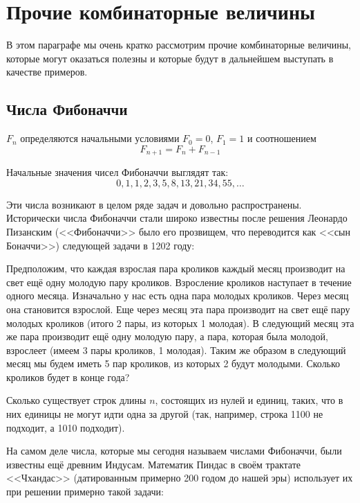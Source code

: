 \section{Прочие комбинаторные величины}

В этом параграфе мы очень кратко рассмотрим прочие комбинаторные величины, которые могут оказаться полезны и которые будут в дальнейшем выступать в качестве примеров.

\subsection{Числа Фибоначчи}

\begin{definition}
 $F_n$ определяются начальными условиями $F_0 = 0$, $F_1 = 1$ и соотношением
$$F_{n+1} = F_n + F_{n-1}$$
\end{definition}

Начальные значения чисел Фибоначчи выглядят так:
$$0, 1, 1, 2, 3, 5, 8, 13, 21, 34, 55, \ldots$$

Эти числа возникают в целом ряде задач и довольно распространены. Исторически числа Фибоначчи стали широко известны после решения Леонардо Пизанским (<<Фибоначчи>>  было его прозвищем, что переводится как <<сын Боначчи>>) следующей задачи в 1202 году:

\begin{exercise}
Предположим, что каждая взрослая пара кроликов каждый месяц производит на свет ещё одну молодую пару кроликов. Взросление кроликов наступает в течение одного месяца. Изначально у нас есть одна пара молодых кроликов. Через месяц она становится взрослой. Еще через месяц эта пара производит на свет ещё пару молодых кроликов (итого 2 пары, из которых 1 молодая). В следующий месяц эта же пара производит ещё одну молодую пару, а пара, которая была молодой, взрослеет (имеем 3 пары кроликов, 1 молодая). Таким же образом в следующий месяц мы будем иметь 5 пар кроликов, из которых 2 будут молодыми. Сколько кроликов будет в конце года?
\end{exercise}

\begin{exercise}
Сколько существует строк длины $n$, состоящих из нулей и единиц, таких, что в них единицы не могут идти одна за другой (так, например, строка 1100 не подходит, а 1010 подходит).
\end{exercise}

На самом деле числа, которые мы сегодня называем числами Фибоначчи, были известны ещё древним Индусам. Математик Пиндас в своём трактате <<Чхандас>> (датированным примерно 200 годом до нашей эры) использует их при решении примерно такой задачи:

